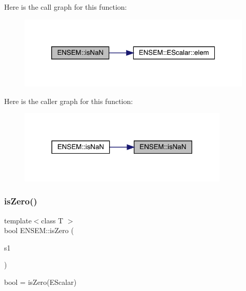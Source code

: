 Here is the call graph for this function\+:
\nopagebreak
\begin{figure}[H]
\begin{center}
\leavevmode
\includegraphics[width=320pt]{d4/dca/group__escalar_gada6bc3d89f9c0b0dc55465bdcbb35a78_cgraph}
\end{center}
\end{figure}
Here is the caller graph for this function\+:
\nopagebreak
\begin{figure}[H]
\begin{center}
\leavevmode
\includegraphics[width=285pt]{d4/dca/group__escalar_gada6bc3d89f9c0b0dc55465bdcbb35a78_icgraph}
\end{center}
\end{figure}
\mbox{\label{group__escalar_ga114fe2eec1be253ca86ecb5290d189fc}} 
\subsubsection{\texorpdfstring{isZero()}{isZero()}}
{\footnotesize\ttfamily template$<$class T $>$ \\
bool E\+N\+S\+E\+M\+::is\+Zero (\begin{DoxyParamCaption}\item[{const \mbox{\hyperlink{classENSEM_1_1EScalar}{E\+Scalar}}$<$ T $>$ \&}]{s1 }\end{DoxyParamCaption})}



bool = is\+Zero(\+E\+Scalar) 

